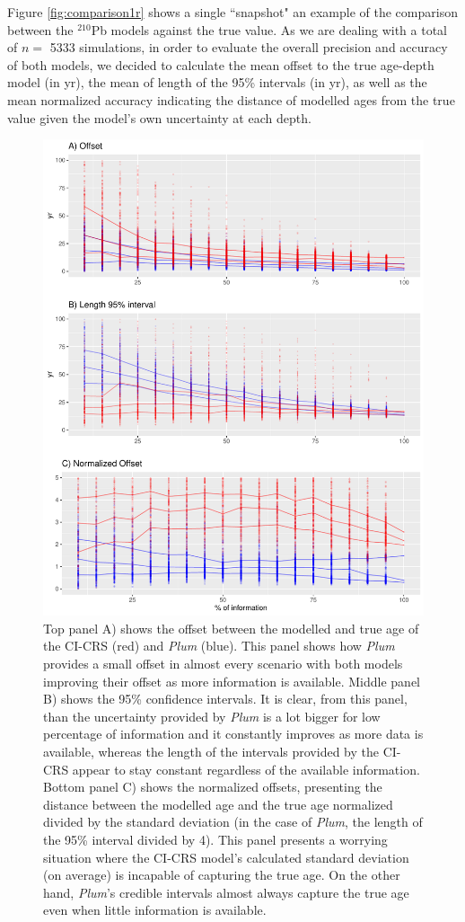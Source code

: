 \documentclass [10pt] {article}
\begin{document}
Figure \ref{fig:comparison1r} shows a single ``snapshot" an example of the comparison between the $^{210}$Pb models against the true value. 
As we are dealing with a total of $n =$ 5333 simulations, in order to evaluate the overall precision and accuracy of both models, we decided to calculate the mean offset to the true age-depth model (in yr), the mean of length of the 95\% intervals (in yr), as well as the mean normalized accuracy indicating the distance of modelled ages from the true value given the model's own uncertainty at each depth.  

\begin{figure}[!]
 \centering
  \includegraphics[width=.75\linewidth]{AccPrec.pdf}
	\caption{Top panel A) shows the offset between the modelled and true age of the CI-CRS (red) and \textit{Plum} (blue). This panel shows how \textit{Plum} provides a small offset in almost every scenario with both models improving their offset as more information is available. Middle panel B) shows the 95\% confidence intervals. It is clear, from this panel, than the uncertainty provided by \textit{Plum} is a lot bigger for low percentage of information and it constantly improves as more data is available, whereas the length of the intervals provided by the CI-CRS appear to stay constant regardless of the available information. Bottom panel C) shows the normalized offsets, presenting the distance between the modelled age and the true age normalized divided by the standard deviation (in the case of \textit{Plum}, the length of the 95\% interval divided by 4). This panel presents a worrying situation where the CI-CRS model's calculated standard deviation (on average) is incapable of capturing the true age. On the other hand, \textit{Plum}'s credible intervals almost always capture the true age even when little information is available.}
  \label{fig:accpre}
\end{figure}
\end{document}
